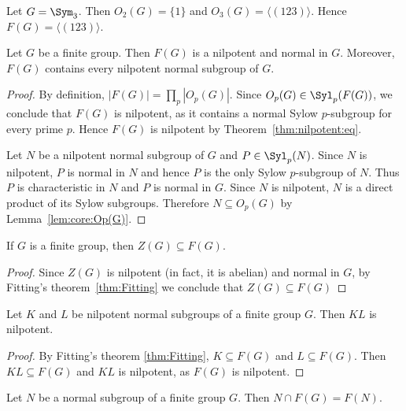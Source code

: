 \begin{example}
Let $G=\Sym_3$. Then $O_2(G)=\{1\}$ and $O_3(G)=\langle
(123)\rangle$. Hence $F(G)=\langle (123)\rangle$.
\end{example}

\begin{theorem}[Fitting]
\label{thm:Fitting}
Let $G$ be a finite group. Then $F(G)$ is a nilpotent and normal in $G$.
Moreover, $F(G)$ contains every nilpotent normal subgroup of $G$.
\end{theorem}

\begin{proof}
By definition, $|F(G)|=\prod_p|O_p(G)|$.
Since $O_p(G)\in\Syl_p(F(G))$, we conclude that $F(G)$ is nilpotent, as it contains 
a normal Sylow $p$-subgroup for every prime $p$. 
Hence $F(G)$ is nilpotent by Theorem~\ref{thm:nilpotent:eq}.

Let $N$ be a nilpotent normal subgroup of $G$ and $P\in\Syl_p(N)$. Since 
$N$ is nilpotent, $P$ is normal in $N$ and hence $P$ is the only 
Sylow $p$-subgroup of $N$. Thus $P$ is characteristic in $N$ and 
$P$ is normal in $G$. Since $N$ is nilpotent, $N$ is a direct product of its Sylow subgroups. 
Therefore $N\subseteq O_p(G)$ by Lemma~\ref{lem:core:Op(G)}.
\end{proof}

\begin{corollary}
\label{cor:Z(G)subsetF(G)}
If $G$ is a finite group, then $Z(G)\subseteq F(G)$.
\end{corollary}

\begin{proof}
Since $Z(G)$ is nilpotent (in fact, it is abelian) and 
normal in $G$, by Fitting's theorem~\ref{thm:Fitting} we conclude that 
$Z(G)\subseteq F(G)$ 
\end{proof}

\begin{corollary}[Fitting]
\label{cor:Fitting}
Let $K$ and $L$ be nilpotent normal subgroups of a finite group $G$. 
Then $KL$ is nilpotent. 
\end{corollary}

\begin{proof}
By Fitting's theorem \ref{thm:Fitting}, $K\subseteq F(G)$ and 
$L\subseteq F(G)$. Then $KL\subseteq F(G)$ and $KL$ is nilpotent, as 
$F(G)$ is nilpotent. 
\end{proof}

\begin{corollary}
\label{cor:McapF(G)}
Let $N$ be a normal subgroup of a finite group $G$. Then 
$N\cap F(G)=F(N)$.
\end{corollary}

